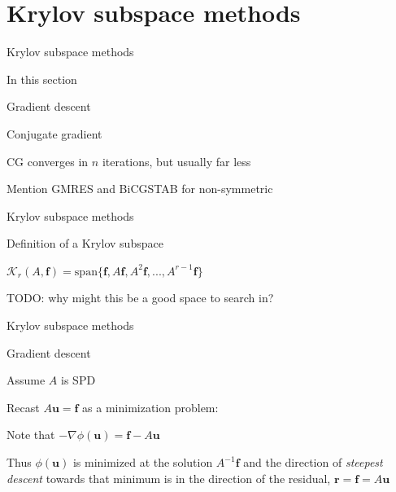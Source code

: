 \documentclass[18pt,xcolor=table]{beamer}
\begin{document}

\section{Krylov subspace methods}

\begin{frame}{Krylov subspace methods}
\begin{block}{In this section}
\bit
\item Gradient descent
\item Conjugate gradient
\item CG converges in $n$ iterations, but usually far less
\item Mention GMRES and BiCGSTAB for non-symmetric
\eit
\end{block}
\end{frame}

\begin{frame}{Krylov subspace methods}
\begin{block}{Definition of a Krylov subspace}
\bit
\item $\mathcal{K}_r(A,\mathbf{f}) = \text{span}\{\mathbf{f},A\mathbf{f},A^2\mathbf{f},...,A^{r-1}\mathbf{f}\}$
\item TODO: why might this be a good space to search in?
\eit
\end{block}
\end{frame}

\begin{frame}{Krylov subspace methods}
\begin{block}{Gradient descent}
\bit
\item Assume $A$ is SPD
\item Recast $A\mathbf{u} = \mathbf{f}$ as a minimization problem:
\item Note that $-\nabla \phi(\mathbf{u}) = \mathbf{f} - A\mathbf{u}$
\item Thus $\phi(\mathbf{u})$ is minimized at the solution $A^{-1}\mathbf{f}$ and the direction of \emph{steepest descent} towards that minimum is in the direction of the residual, $\mathbf{r} = \mathbf{f} = A\mathbf{u}$
\eit
\end{block}
\end{frame}

\end{document}
